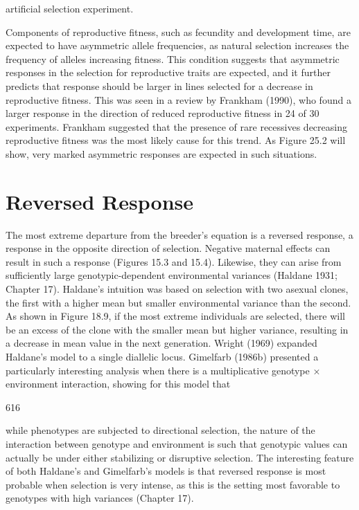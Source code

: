 \documentclass{article}
\begin{document}
artificial selection experiment.

Components of reproductive fitness, such as fecundity and development time, are expected to have asymmetric allele frequencies, as natural selection increases the frequency of alleles increasing fitness. This condition suggests that asymmetric responses in the selection for reproductive traits are expected, and it further predicts that response should be larger in lines selected for a decrease in reproductive fitness. This was seen in a review by Frankham (1990), who found a larger response in the direction of reduced reproductive fitness in 24 of 30 experiments. Frankham suggested that the presence of rare recessives decreasing reproductive fitness was the most likely cause for this trend. As Figure 25.2 will show, very marked asymmetric responses are expected in such situations.

\section{Reversed Response}
The most extreme departure from the breeder's equation is a reversed response, a response in the opposite direction of selection. Negative maternal effects can result in such a response (Figures 15.3 and 15.4). Likewise, they can arise from sufficiently large genotypic-dependent environmental variances (Haldane 1931; Chapter 17). Haldane's intuition was based on selection with two asexual clones, the first with a higher mean but smaller environmental variance than the second. As shown in Figure 18.9, if the most extreme individuals are selected, there will be an excess of the clone with the smaller mean but higher variance, resulting in a decrease in mean value in the next generation. Wright (1969) expanded Haldane's model to a single diallelic locus. Gimelfarb (1986b) presented a particularly interesting analysis when there is a multiplicative genotype × environment interaction, showing for this model that

616

while phenotypes are subjected to directional selection, the nature of the interaction between genotype and environment is such that genotypic values can actually be under either stabilizing or disruptive selection. The interesting feature of both Haldane's and Gimelfarb's models is that reversed response is most probable when selection is very intense, as this is the setting most favorable to genotypes with high variances (Chapter 17).
\end{document}
